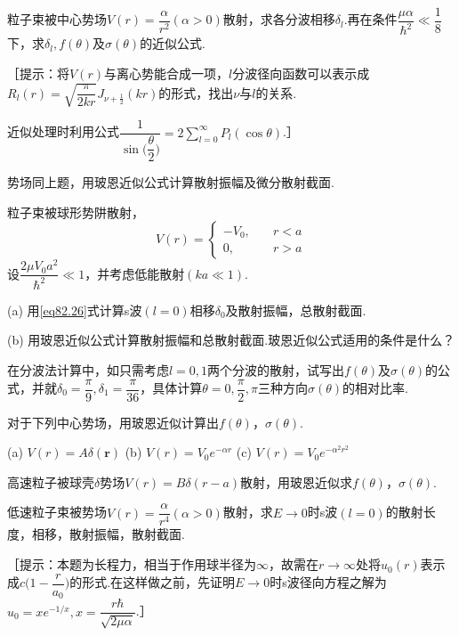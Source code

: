 \begin{exercises}
	
\exercise 粒子束被中心势场$V(r)=\dfrac{\alpha}{r^{2}}(\alpha>0)$散射，求各分波相移$\delta_{l}$.再在条件$\dfrac{\mu\alpha}{\hbar^{2}}\ll\dfrac{1}{8}$下，求$\delta_{l},f(\theta)$及$\sigma(\theta)$的近似公式.

［提示：将$V(r)$与离心势能合成一项，$l$分波径向函数可以表示成$R_{l}(r)=\sqrt{\dfrac{\pi}{2kr}}J_{\nu+\frac{1}{2}}(kr)$的形式，找出$\nu$与$l$的关系.

近似处理时利用公式$\dfrac{1}{\sin\bigg(\dfrac{\theta}{2}\bigg)}=2\sum_{l=0}^{\infty}P_{l}(\cos\theta)$.］
	
\exercise 势场同上题，用玻恩近似公式计算散射振幅及微分散射截面.
	
\exercise 粒子束被球形势阱散射，
\begin{equation*}
	V(r)=\begin{cases}
		-V_{0}, \quad&r<a	\\
		0,\quad &r>a
	\end{cases}
\end{equation*}
设$\dfrac{2\mu V_{0}a^{2}}{\hbar^{2}}\ll1$，并考虑低能散射$(ka\ll1)$.

(a) 用\eqref{eq82.26}式计算s波$(l=0)$相移$\delta_{0}$及散射振幅，总散射截面.

(b) 用玻恩近似公式计算散射振幅和总散射截面.玻恩近似公式适用的条件是什么？

\exercise 在分波法计算中，如只需考虑$l=0,1$两个分波的散射，试写出$f(\theta)$及$\sigma(\theta)$的公式，并就$\delta_{0}=\dfrac{\pi}{9},\delta_{1}=\dfrac{\pi}{36}$，具体计算$\theta=0,\dfrac{\pi}{2},\pi$三种方向$\sigma(\theta)$的相对比率.
	
\exercise 对于下列中心势场，用玻恩近似计算出$f(\theta)$，$\sigma(\theta)$.

(a)	$V(r)=A\delta(\boldsymbol{r})$ (b) $V(r)=V_{0}e^{-\alpha r}$ (c) $V(r)=V_{0}e^{-\alpha^{2}r^{2}}$
	
\exercise 高速粒子被球壳$\delta$势场$V(r)=B\delta(r-a)$散射，用玻恩近似求$f(\theta)$，$\sigma(\theta)$.
	
\exercise 低速粒子束被势场$V(r)=\dfrac{\alpha}{r^{4}}(\alpha>0)$散射，求$E\rightarrow0$时s波$(l=0)$的散射长度，相移，散射振幅，散射截面.

［提示：本题为长程力，相当于作用球半径为$\infty$，故需在$r\rightarrow\infty$处将$u_{0}(r)$表示成$c\bigg(1-\dfrac{r}{a_{0}}\bigg)$的形式.在这样做之前，先证明$E\rightarrow0$时s波径向方程之解为$u_{0}=xe^{-1/x},x=\dfrac{r\hbar}{\sqrt{2\mu\alpha}}$.］
	

\end{exercises}
